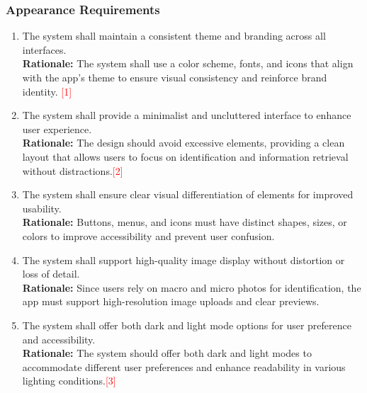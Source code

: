 \documentclass{article}
\begin{document}
\subsubsection{Appearance Requirements}
\label{ssub:appearance_requirements}
\begin{enumerate}[{LF-A}1. ]
	\item The system shall maintain a consistent theme and branding across all interfaces.\\
	\textbf{Rationale:} The system shall use a color scheme, fonts, and icons that align with the app’s theme to ensure visual consistency and reinforce brand identity. \textcolor{red}{[1]}
	\item The system shall provide a minimalist and uncluttered interface to enhance user experience.\\
	\textbf{Rationale:} The design should avoid excessive elements, providing a clean layout that allows users to focus on identification and information retrieval without distractions.\textcolor{red}{[2]}
	\item The system shall ensure clear visual differentiation of elements for improved usability.\\
	\textbf{Rationale:} Buttons, menus, and icons must have distinct shapes, sizes, or colors to improve accessibility and prevent user confusion.
	\item The system shall support high-quality image display without distortion or loss of detail.\\
	\textbf{Rationale:} Since users rely on macro and micro photos for identification, the app must support high-resolution image uploads and clear previews.
	\item The system shall offer both dark and light mode options for user preference and accessibility.\\
	\textbf{Rationale:} The system should offer both dark and light modes to accommodate different user preferences and enhance readability in various lighting conditions.\textcolor{red}{[3]}
\end{enumerate}
\end{document}
